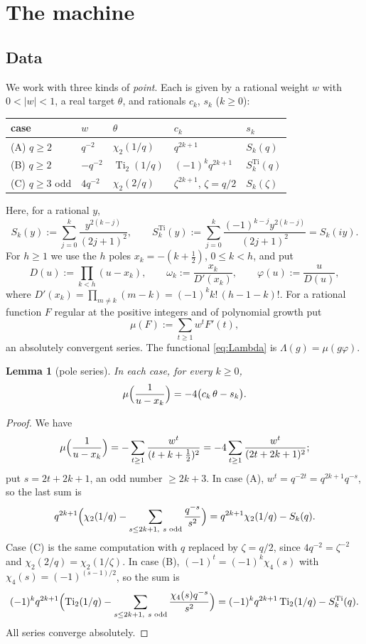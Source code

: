 \documentclass[11pt]{amsart}
\newtheorem{lemma}[theorem]{Lemma}
\theoremstyle{definition}
\theoremstyle{remark}
\numberwithin{equation}{section}
\newcommand{\Ti}{\operatorname{Ti}}
\begin{document}
\section{The machine}\label{sec:construction}

\subsection{Data}\label{sec:data}
We work with three kinds of \emph{point}. Each is given by a rational weight $w$ with $0<|w|<1$, a real target $\theta$,
and rationals $c_k$, $s_k$ ($k\ge0$):
\begin{center}
\begin{tabular}{@{}lllll@{}}
\toprule
case & $w$ & $\theta$ & $c_k$ & $s_k$\\
\midrule
(A) $q\ge2$ & $q^{-2}$ & $\chi_2(1/q)$ & $q^{2k+1}$ & $S_k(q)$\\
(B) $q\ge2$ & $-q^{-2}$ & $\Ti_2(1/q)$ & $(-1)^kq^{2k+1}$ & $S_k^{\Ti}(q)$\\
(C) $q\ge3$ odd & $4q^{-2}$ & $\chi_2(2/q)$ & $\zeta^{2k+1}$, $\zeta=q/2$ & $S_k(\zeta)$\\
\bottomrule
\end{tabular}
\end{center}
Here, for a rational $y$,
\[
  S_k(y):=\sum_{j=0}^{k}\frac{y^{2(k-j)}}{(2j+1)^2},\qquad
  S_k^{\Ti}(y):=\sum_{j=0}^{k}\frac{(-1)^{k-j}y^{2(k-j)}}{(2j+1)^2}=S_k(iy).
\]
For $h\ge1$ we use the $h$ poles $x_k=-(k+\frac12)$, $0\le k<h$, and put
\[
  D(u):=\prod_{k<h}(u-x_k),\qquad \omega_k:=\frac{x_k}{D'(x_k)},\qquad \varphi(u):=\frac u{D(u)},
\]
where $D'(x_k)=\prod_{m\ne k}(m-k)=(-1)^kk!\,(h-1-k)!$. For a rational function $F$ regular at the positive integers and of
polynomial growth put
\[
  \mu(F):=\sum_{t\ge1}w^tF'(t),
\]
an absolutely convergent series. The functional \eqref{eq:Lambda} is $\Lambda(g)=\mu(g\varphi)$.

\begin{lemma}[pole series]\label{lem:poleseries}
In each case, for every $k\ge0$,
\[
  \mu\Bigl(\frac1{u-x_k}\Bigr)=-4\bigl(c_k\,\theta-s_k\bigr).
\]
\end{lemma}

\begin{proof}
We have
\[
  \mu\Bigl(\frac1{u-x_k}\Bigr)=-\sum_{t\ge1}\frac{w^t}{(t+k+\frac12)^2}=-4\sum_{t\ge1}\frac{w^t}{(2t+2k+1)^2};
\]
put $s=2t+2k+1$, an odd number $\ge2k+3$. In case (A), $w^t=q^{-2t}=q^{2k+1}q^{-s}$, so the last sum is
\[
  q^{2k+1}\Bigl(\chi_2(1/q)-\sum_{s\le2k+1,\ s\text{ odd}}\frac{q^{-s}}{s^2}\Bigr)=q^{2k+1}\chi_2(1/q)-S_k(q).
\]
Case (C) is the same computation with $q$ replaced by $\zeta=q/2$, since $4q^{-2}=\zeta^{-2}$ and
$\chi_2(2/q)=\chi_2(1/\zeta)$. In case (B), $(-1)^t=(-1)^k\chi_4(s)$ with $\chi_4(s)=(-1)^{(s-1)/2}$, so the sum is
\[
  (-1)^kq^{2k+1}\Bigl(\Ti_2(1/q)-\sum_{s\le2k+1,\ s\text{ odd}}\frac{\chi_4(s)q^{-s}}{s^2}\Bigr)=(-1)^kq^{2k+1}\Ti_2(1/q)-S_k^{\Ti}(q).
\]
All series converge absolutely.
\end{proof}
\end{document}
